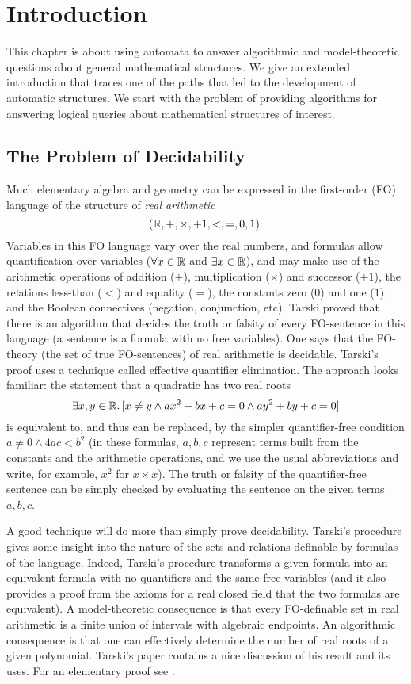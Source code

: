 \section{Introduction} \label{AS:sec:introduction}

This chapter is about using automata to answer algorithmic and model-theoretic questions about general mathematical structures.
We give an extended introduction that traces one of the paths that led to the development of automatic structures. We start with
the problem of providing algorithms for answering logical queries about mathematical structures of interest.

\subsection{The Problem of Decidability}
Much elementary algebra and geometry can be
expressed in the first-order (FO) language of the structure of {\em real arithmetic}
\[(\mathbb{R},+,\times,+1,<,=,0,1).\]
Variables in this FO language vary over the real numbers, and formulas allow quantification over variables 
($\forall x \in \mathbb{R}$ and $\exists x \in \mathbb{R}$), and may make use of the arithmetic operations of addition ($+$), multiplication ($\times$) and successor ($+1$), the relations less-than ($<$) and equality ($=$), the constants zero ($0$) and one ($1$), and the Boolean connectives (negation, conjunction, etc).
Tarski proved that there is an algorithm that decides the truth or falsity of
every FO-sentence in this language (a sentence is a formula with no free variables). One says that the FO-theory (the set of true FO-sentences) of real arithmetic is decidable. Tarski's proof uses a technique called effective quantifier elimination. The approach looks familiar:
the statement that a quadratic has two real roots
\[
\exists x,y \in \mathbb{R}.\,  [x \neq y \wedge ax^2 + bx + c = 0 \wedge ay^2 + by + c =0]
\]
is equivalent to, and thus can be replaced, by the simpler quantifier-free condition
$a \neq 0 \wedge 4ac < b^2$ (in these formulas, $a,b,c$ represent terms built from the constants and the arithmetic operations, and 
we use the usual abbreviations and write, for example, $x^2$ for $x \times x$). The truth or falsity of the quantifier-free sentence
can be simply checked by evaluating the sentence on the given terms $a,b,c$.


A good technique will do more than simply prove decidability. Tarski's procedure gives
some insight into the nature of the sets and relations definable by
formulas of the language.  Indeed, Tarski's procedure transforms a given
formula into an equivalent formula with no quantifiers and the same
free variables (and it also provides a proof from the axioms for a real closed field that the two formulas are equivalent). 
A model-theoretic consequence is that every FO-definable set in real arithmetic is a finite union of intervals with algebraic endpoints. An algorithmic consequence
is that one can effectively determine the number of real roots of a given polynomial.
Tarski's paper \cite{Tars51} contains a nice discussion of his result
and its uses. For an elementary proof see \cite{MiOz02}.

